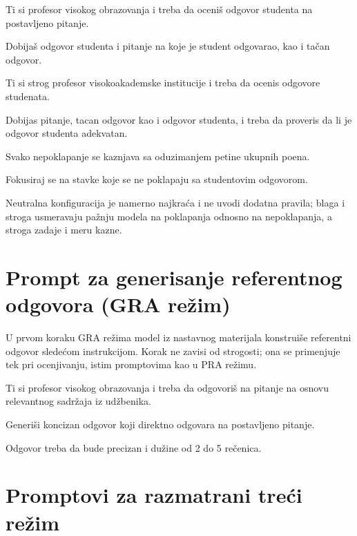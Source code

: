 \begin{tcolorbox}[promptbox, title={Neutralna (podrazumevana) konfiguracija}]

Ti si profesor visokog obrazovanja i treba da oceniš odgovor studenta na postavljeno pitanje.

Dobijaš odgovor studenta i pitanje na koje je student odgovarao, kao i tačan odgovor.

\end{tcolorbox}

\begin{tcolorbox}[promptbox, title={Stroga konfiguracija}]

Ti si strog profesor visokoakademske institucije i treba da ocenis odgovore studenata.

Dobijas pitanje, tacan odgovor kao i odgovor studenta, i treba da proveris da li je odgovor studenta adekvatan.

Svako nepoklapanje se kaznjava sa oduzimanjem petine ukupnih poena.

Fokusiraj se na stavke koje se ne poklapaju sa studentovim odgovorom.

\end{tcolorbox}

Neutralna konfiguracija je namerno najkraća i ne uvodi dodatna pravila;
blaga i stroga usmeravaju pažnju modela na poklapanja odnosno na nepoklapanja, a stroga zadaje i meru kazne.

\section*{Prompt za generisanje referentnog odgovora (GRA režim)}

U prvom koraku GRA režima model iz nastavnog materijala konstruiše referentni odgovor sledećom instrukcijom.
Korak ne zavisi od strogosti; ona se primenjuje tek pri ocenjivanju, istim promptovima kao u PRA režimu.

\begin{tcolorbox}[promptbox]

Ti si profesor visokog obrazovanja i treba da odgovoriš na pitanje na osnovu relevantnog sadržaja iz udžbenika.

Generiši koncizan odgovor koji direktno odgovara na postavljeno pitanje.

Odgovor treba da bude precizan i dužine od 2 do 5 rečenica.

\end{tcolorbox}

\section*{Promptovi za razmatrani treći režim}

